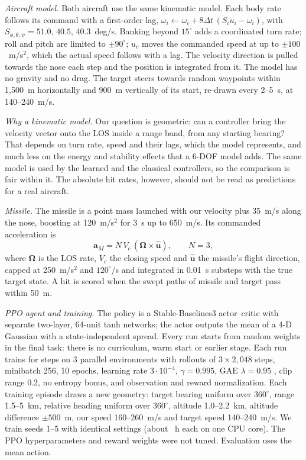 \documentclass[conference]{IEEEtran}
\begin{document}
\emph{Aircraft model.} Both aircraft use the same kinematic model. Each body rate follows its command with a first-order lag, $\omega_i\leftarrow\omega_i+8\Delta t\,(S_iu_i-\omega_i)$, with $S_{\phi,\theta,\psi}=51.0,\,40.5,\,40.3$~deg/s. Banking beyond $15^\circ$ adds a coordinated turn rate; roll and pitch are limited to $\pm90^\circ$; $u_v$ moves the commanded speed at up to $\pm100$~m/s$^2$, which the actual speed follows with a lag. The velocity direction is pulled towards the nose each step and the position is integrated from it. The model has no gravity and no drag. The target steers towards random waypoints within 1,500~m horizontally and 900~m vertically of its start, re-drawn every 2--5~s, at 140--240~m/s.

\emph{Why a kinematic model.} Our question is geometric: can a controller bring the velocity vector onto the LOS inside a range band, from any starting bearing? That depends on turn rate, speed and their lags, which the model represents, and much less on the energy and stability effects that a 6-DOF model adds. The same model is used by the learned and the classical controllers, so the comparison is fair within it. The absolute hit rates, however, should not be read as predictions for a real aircraft.

\emph{Missile.} The missile is a point mass launched with our velocity plus 35~m/s along the nose, boosting at 120~m/s$^2$ for 3~s up to 650~m/s. Its commanded acceleration is
\begin{equation}
\mathbf{a}_M = N\,V_c\,(\boldsymbol\Omega\times\hat{\mathbf{u}}),\qquad N=3,
\label{eq:pn}
\end{equation}
where $\boldsymbol\Omega$ is the LOS rate, $V_c$ the closing speed and $\hat{\mathbf{u}}$ the missile's flight direction, capped at 250~m/s$^2$ and $120^\circ$/s and integrated in 0.01~s substeps with the true target state. A hit is scored when the swept paths of missile and target pass within 50~m.

\emph{PPO agent and training.} The policy is a Stable-Baselines3 \cite{raffin2021sb3} actor--critic with separate two-layer, 64-unit tanh networks; the actor outputs the mean of a 4-D Gaussian with a state-independent spread. Every run starts from random weights in the final task: there is no curriculum, warm start or earlier stage. Each run trains for \RTrainSteps{} steps on 3 parallel environments with rollouts of $3\times2{,}048$ steps, minibatch 256, 10 epochs, learning rate $3\cdot10^{-4}$, $\gamma=0.995$, GAE $\lambda=0.95$ \cite{schulman2016gae}, clip range 0.2, no entropy bonus, and observation and reward normalization. Each training episode draws a new geometry: target bearing uniform over $360^\circ$, range 1.5--5~km, relative heading uniform over $360^\circ$, altitude 1.0--2.2~km, altitude difference $\pm500$~m, our speed 160--260~m/s and target speed 140--240~m/s. We train seeds 1--5 with identical settings (about \RTrainHours~h each on one CPU core). The PPO hyperparameters and reward weights were not tuned. Evaluation uses the mean action.
\end{document}
